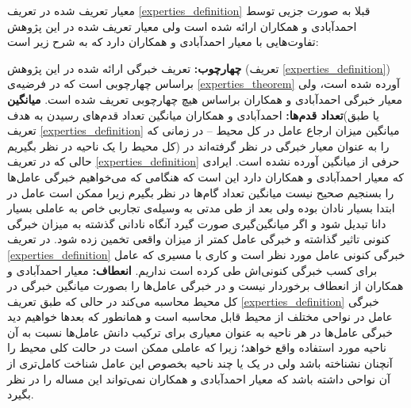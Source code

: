 معیار تعریف شده در تعریف
\ref{experties_definition}
قبلا به صورت جزیی توسط احمدآبادی و همکاران ارائه شده است ولی معیار تعریف شده در این پژوهش تفاوت‌هایی با معیار احمدآبادی و همکاران دارد که به شرح زیر است:
\begin{enumerate}
 \textbf{چهارچوب:} تعریف خبرگی ارائه شده در این پژوهش (تعریف
\ref{experties_definition})
براساس چهارچوبی است که در فرضیه‌ی
\ref{experties_theorem}
آورده شده است، ولی معیار خبرگی احمدآبادی و همکاران براساس هیچ چهارچوبی تعریف شده است.
 \textbf{میانگین تعداد قدم‌ها:} احمدآبادی و همکاران میانگین تعداد قدم‌های رسیدن به هدف(یا طبق تعریف
\ref{experties_definition}
میانگین میزان ارجاع عامل در کل محیط -- در زمانی که کل محیط را یک ناحیه در نظر بگیریم) را به عنوان معیار خبرگی در نظر گرفته‌اند در حالی که در تعریف
\ref{experties_definition}
حرفی از میانگین آورده نشده است.  ایرادی که معیار احمدآبادی و همکاران دارد این است که هنگامی که می‌خواهیم خبرگی عامل‌ها را بسنجیم صحیح نیست میانگین تعداد گام‌ها در نظر بگیرم زیرا ممکن است عامل در ابتدا بسیار نادان بوده ولی بعد از طی مدتی به وسیله‌ی تجاربی خاص به عاملی بسیار دانا تبدیل شود و اگر میانگین‌گیری صورت گیرد آنگاه نادانی گذشته به میزان خبرگی کنونی تاثیر گذاشته و خبرگی عامل کمتر از میزان واقعی تخمین زده شود. در تعریف
\ref{experties_definition}
خبرگی کنونی عامل مورد نظر است و کاری با مسیری که عامل برای کسب خبرگی کنونی‌اش طی کرده است نداریم.
 \textbf{انعطاف:} معیار احمدآبادی و همکاران از انعطاف برخوردار نیست و در خبرگی عامل‌ها را بصورت میانگین خبرگی در کل محیط محاسبه می‌کند در حالی که طبق تعریف
\ref{experties_definition}
خبرگی عامل در نواحی مختلف از محیط قابل محاسبه است و همانطور که بعدها خواهیم دید خبرگی عامل‌ها در هر ناحیه به عنوان معیاری برای ترکیب دانش عامل‌ها نسبت به آن ناحیه مورد استفاده واقع خواهد؛ زیرا که عاملی ممکن است در حالت کلی محیط را آنچنان نشناخته باشد ولی در یک یا چند ناحیه بخصوص این عامل شناخت کامل‌تری از آن نواحی داشته باشد که معیار احمدآبادی و همکاران نمی‌تواند این مساله را در نظر بگیرد.
\end{enumerate}



